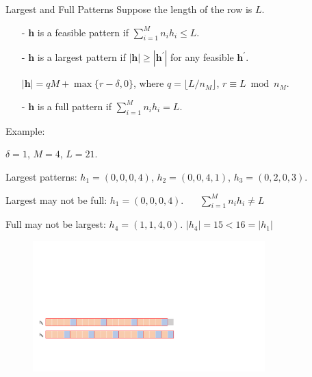   \begin{frame}{Largest and Full Patterns}
    Suppose the length of the row is $L$.
    \begin{itemize}
      \item[-] $\bm{h}$ is a feasible pattern if $\sum_{i=1}^{M} n_i h_i \leq L$.
      \item[-] $\bm{h}$ is a {\color{red}largest} pattern if $|\bm{h}| \geq |\bm{h}^{\prime}|$ for any feasible $\bm{h}^{\prime}$.
      
      $|\bm{h}| = qM + \max\{r-\delta, 0\}$, where $q = \lfloor L/n_M \rfloor$, $r \equiv L \bmod n_M$.
      \item[-] $\bm{h}$ is a {\color{red}full} pattern if $\sum_{i=1}^{M} n_i h_i = L$.  
    \end{itemize}

     {\color{green} Example}: 
      
      $\delta = 1$, $M =4$, $L = 21$.
      
      Largest patterns: $h_1 = (0, 0, 0, 4)$, $h_2 = (0, 0, 4, 1)$, $h_3 = (0, 2, 0, 3)$.

      Largest may not be full: $h_1 = (0, 0, 0, 4)$. {\color{red} $\quad$ $\sum_{i=1}^{M} n_i h_i \neq L$}

      Full may not be largest: $h_4 = (1, 1, 4, 0)$. {\color{red} $|h_4| = 15 < 16 = |h_1|$}

      \begin{figure}[ht]
        \centering
        \includegraphics[width = 0.8\textwidth]{./images/full_largest.pdf}
      \end{figure}
  \end{frame}